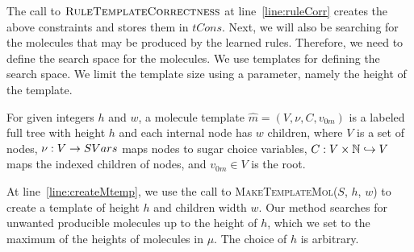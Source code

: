 The call to $\textsc{RuleTemplateCorrectness}$ at
line~\ref{line:ruleCorr} creates the above constraints
and stores them in $tCons$.
Next, we will also be searching for the molecules that may be produced by the learned rules.
Therefore, we need to define the search space for the molecules.
We use templates for defining the search space.
We limit the template size using a parameter,
namely the height of the template.
\begin{df}
For given integers $h$ and $w$,
a {molecule template} $\hat{m} = (V, \nu, C, v_{0m})$ is a labeled full tree with height $h$ and 
each internal node has $w$ children, where 
$V$ is a set of nodes, $\nu : V \rightarrow SVars$ maps nodes to sugar choice variables,
$C : V \times \mathbb{N} \hookrightarrow V$ maps the indexed children of nodes,
and
$v_{0m} \in V$ is the root.
\end{df}
At line~\ref{line:createMtemp}, we use the call to \textsc{MakeTemplateMol}($S$, $h$, $w$) to
create a template of height $h$ and children width $w$.
%
Our method searches for unwanted producible molecules up to the height of $h$,
which we set to the maximum of the heights of molecules in $\mu$.
%
The choice of $h$ is arbitrary.

